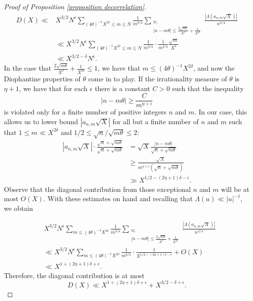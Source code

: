 \documentclass[a4paper,12pt, reqn0]{amsart}
\theoremstyle{remark}
\begin{document}
\begin{proof}[Proof of Proposition \ref{proposition decorrelation}]
\begin{align*}
  D(X)\ll
  &X^{3/2}N^\epsilon\sum_{(4\theta)^{-1}X^{2\delta}\leq m\leq N}\frac{1}{m^{3/4}}\sum_{\substack{n;\\|n-m\theta|\leq\frac{2\sqrt{m\theta}}{X^\delta}+\frac{1}{X^{2\delta}}}}\frac{|\Lambda(a_{n,m}\sqrt{X})|}{n^{3/4}}\\
&\ll
X^{3/2}N^\epsilon\sum_{ (4\theta)^{-1}X^{2\delta}\leq m\leq N}\frac{1}{m^{3/4}}\cdot \frac{1}{m^{3/4}}\frac{\sqrt{m}}{X^\delta}\\
&\ll X^{3/2-\delta}N^{\epsilon}.
\end{align*}
In the case that
$\frac{2\sqrt{m\theta}}{X^\delta}+\frac{1}{X^{2\delta}}\leq 1$, we
have that $m\leq(4\theta)^{-1}X^{2\delta}$, and now the
Diophantine properties of $\theta$ come in to play. If the
irrationality measure of $\theta$ is $\eta+1$, we have that for each $\epsilon$
there is a constant $C>0$ such that the inequality
$$|n-m\theta|\geq \frac{C}{m^{\eta+\epsilon}}$$ 
is violated only for a finite number of positive integers $n$ and
$m$. In our case, this allows us to lower bound $|a_{n,m}\sqrt{X}|$
for all but a finite number of $n$ and $m$ such that
$1\leq m\ll X^{2\delta}$ and $1/2\le \sqrt{n}/\sqrt{m\theta}\le 2$:
\begin{align*}
|a_{n,m}\sqrt{X}|\cdot\frac{\sqrt{n}+\sqrt{m\theta}}{\sqrt{n}+\sqrt{m\theta}}&=\sqrt{X}\frac{|n-m\theta|}{\sqrt{n}+\sqrt{m\theta}}\\
&\geq \frac{\sqrt{X}}{m^{\eta+\epsilon}(\sqrt{n}+\sqrt{m\theta})}\\
&\gg X^{1/2-(2\eta+1)\delta-\epsilon}.  
\end{align*}
Observe that the diagonal contribution from those exceptional $n$ and $m$ will be at most $O(X)$. With these estimates on hand and recalling that $\Lambda(u)\ll |u|^{-1}$, we obtain

\begin{align*}
&X^{3/2}N^\epsilon\sum_{m\leq (4\theta)^{-1}X^{2\delta}}\frac{1}{m^{3/4}}\sum_{\substack{n;\\|n-m\theta|\leq\frac{2\sqrt{m\theta}}{X^\delta}+\frac{1}{X^{2\delta}}}}\frac{|\Lambda(a_{n,m}\sqrt{X})|}{n^{3/4}}\\
&\ll X^{3/2}N^\epsilon\sum_{m\leq(4\theta)^{-1}X^{2\delta}}\frac{1}{m^{3/2}}\cdot \frac{1}{X^{1/2-(2\eta+1)\delta-\epsilon}}+O(X)\\
& \ll X^{1+(2\eta+1)\delta+\epsilon}.
\end{align*}
Therefore, the diagonal contribution is at most
$$D(X)\ll X^{1+(2\eta+1)\delta+\epsilon} +X^{3/2-\delta+\epsilon}.$$



\end{proof}
\end{document}
